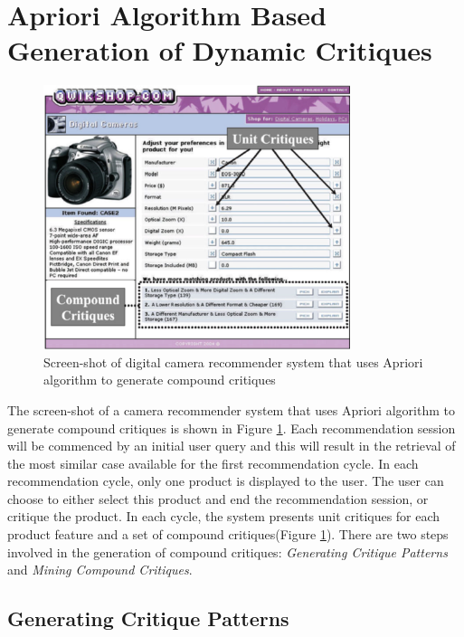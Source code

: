 \section{Apriori Algorithm Based Generation of Dynamic Critiques}
\label{sec:apriori}
\begin{figure}
  \centering
    \includegraphics[width=0.8\textwidth]{figures-bharath/apriori.png}
  \caption{Screen-shot of digital camera recommender system that uses Apriori algorithm to generate compound critiques}
\label{fig:apriori}
\end{figure}
The screen-shot of a camera recommender system that uses Apriori algorithm to generate compound critiques is shown in Figure \ref{fig:apriori}.
 Each recommendation session will be commenced by an initial user query and this will result in the retrieval of the most similar case available for the first recommendation cycle.
In each recommendation cycle, only one product is displayed to the user.
The user can choose to either select this product and end the recommendation session, or critique the product.
In each cycle, the system presents unit critiques for each product feature  and a set of compound critiques(Figure \ref{fig:apriori}).
There are two steps involved in the generation of compound critiques: \textit{Generating Critique Patterns} and \textit{Mining Compound Critiques}.

\subsection{Generating Critique Patterns}
\label{sec:genCritique}


